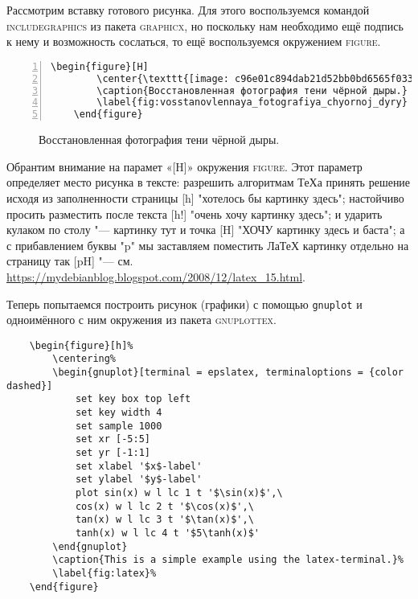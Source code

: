 Рассмотрим вставку готового рисунка. Для этого воспользуемся командой\\ \textsc{includegraphics} из пакета \textsc{graphicx}, но поскольку нам необходимо ещё подпись к нему и возможность сослаться, то ещё воспользуемся окружением \textsc{figure}.
{
\begin{Verbatim}[fontfamily = courier, tabsize = 3, numbers = left, gobble=1]
	\begin{figure}[H]
		\center{\texttt{[image: c96e01c894dab21d52bb0bd6565f0331.jpg]}}
		\caption{Восстановленная фотография тени чёрной дыры.}
		\label{fig:vosstanovlennaya_fotografiya_chyornoj_dyry}
	\end{figure}
\end{Verbatim}
}
\begin{figure}[H]
	\caption{Восстановленная фотография тени чёрной дыры.}
	\label{fig:vosstanovlennaya_fotografiya_chyornoj_dyry}
\end{figure}
Обрантим внимание на парамет «[H]» окружения \textsc{figure}. Этот параметр определяет место рисунка в тексте: разрешить алгоритмам ТеХа принять решение исходя из заполненности страницы [h] "хотелось бы картинку здесь"; настойчиво просить разместить после текста [h!] "очень хочу картинку здесь"; и ударить кулаком по столу "--- картинку тут и точка [H] "ХОЧУ картинку здесь и баста"; а с прибавлением буквы "p" мы заставляем поместить ЛаТеХ картинку отдельно на страницу так [pH] "--- см. \url{https://mydebianblog.blogspot.com/2008/12/latex_15.html}.

Теперь попытаемся построить рисунок (графики) с помощью \texttt{gnuplot} и одноимённого с ним окружения из пакета \textsc{gnuplottex}.
\lstset{language = Gnuplot, frame = none, tabsize = 3, numbers = left, numbersep = 6pt, gobble=1}%
\begin{lstlisting}
	\begin{figure}[h]%
		\centering%
		\begin{gnuplot}[terminal = epslatex, terminaloptions = {color dashed}]
			set key box top left
			set key width 4
			set sample 1000
			set xr [-5:5]
			set yr [-1:1]
			set xlabel '$x$-label'
			set ylabel '$y$-label'
			plot sin(x) w l lc 1 t '$\sin(x)$',\
			cos(x) w l lc 2 t '$\cos(x)$',\
			tan(x) w l lc 3 t '$\tan(x)$',\
			tanh(x) w l lc 4 t '$5\tanh(x)$'
		\end{gnuplot}
		\caption{This is a simple example using the latex-terminal.}%
		\label{fig:latex}%
	\end{figure}
\end{lstlisting}

